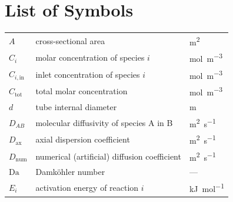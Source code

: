
\chapter*{List of Symbols}

\begin{longtable}{@{} p{} p{} p{} @{}}
\(A\)                   & cross-sectional area                                              & \si{\square\metre}                                  \\
\(C_i\)                 & molar concentration of species \(i\)                              & \si{\mole\per\cubic\metre}                          \\
\(C_{i,\mathrm{in}}\)   & inlet concentration of species \(i\)                              & \si{\mole\per\cubic\metre}                          \\
\(C_{\mathrm{tot}}\)    & total molar concentration                                         & \si{\mole\per\cubic\metre}                          \\
\(d\)                   & tube internal diameter                                            & \si{\metre}                                         \\
\(D_{AB}\)              & molecular diffusivity of species A in B                           & \si{\square\metre\per\second}                       \\
\(D_{\mathrm{ax}}\)     & axial dispersion coefficient                                      & \si{\square\metre\per\second}                       \\
\(D_{\mathrm{num}}\)    & numerical (artificial) diffusion coefficient                      & \si{\square\metre\per\second}                       \\
\(\mathrm{Da}\)         & Damk\"ohler number                                                & ---                                                 \\
\(E_i\)                 & activation energy of reaction \(i\)                               & \si{\kilo\joule\per\mole}                           \\

\end{longtable}
